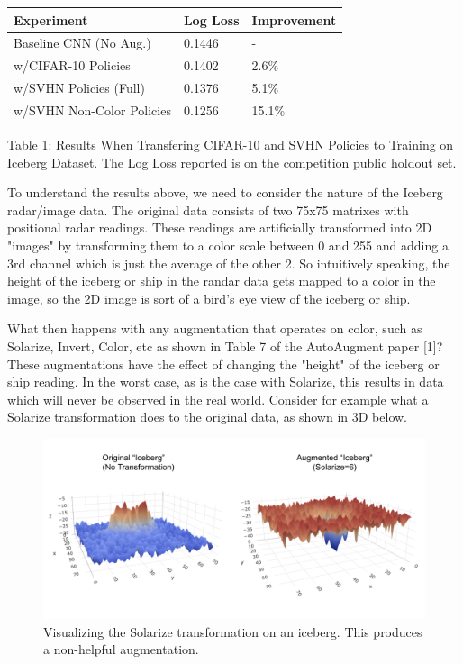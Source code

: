 \documentclass[10pt,twocolumn,letterpaper]{article}
\begin{document}
    \begin{table}[h]
      \begin{tabular}{lll}
        \hline
        Experiment &Log Loss & Improvement   \\ \hline
        Baseline CNN (No Aug.)  &0.1446 &-\\
        w/CIFAR-10 Policies &0.1402  & 2.6\%\\
        w/SVHN Policies (Full) &0.1376  & 5.1\%\\
        w/SVHN Non-Color Policies &0.1256  &15.1\%\\  
        \hline
      \end{tabular}
    \end{table}

Table 1: Results When Transfering CIFAR-10 and SVHN Policies to Training on Iceberg Dataset.  The Log Loss reported is on the competition public holdout set.

To understand the results above, we need to consider the nature of the Iceberg radar/image data.  The original data consists of two 75x75 matrixes with positional radar readings.  These readings are artificially transformed into 2D "images" by transforming them to a color scale between 0 and 255 and adding a 3rd channel which is just the average of the other 2.  So intuitively speaking, the height of the iceberg or ship in the randar data gets mapped to a color in the image, so the 2D image is sort of a bird's eye view of the iceberg or ship.

What then happens with any augmentation that operates on color, such as Solarize, Invert, Color, etc as shown in Table 7 of the AutoAugment paper [1]?  These augmentations have the effect of changing the "height" of the iceberg or ship reading.  In the worst case, as is the case with Solarize, this results in data which will never be observed in the real world.  Consider for example what a Solarize transformation does to the original data, as shown in 3D below.


\begin{figure}[bhp]
\includegraphics[width=\columnwidth]{iceberg_solarize.png}
\caption{Visualizing the Solarize transformation on an iceberg. This produces a non-helpful augmentation.}
\end{figure}
\end{document}
